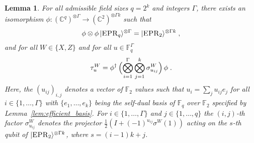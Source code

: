 \documentclass[11pt]{article}
\newtheorem{lemma}[theorem]{Lemma}
\theoremstyle{definition}
\newcommand{\ket}[1]{|#1\rangle}
\newcommand{\Id}{\ensuremath{I}}
\newcommand{\C}{\ensuremath{\mathbb{C}}}
\newcommand{\F}{\ensuremath{\mathbb{F}}}
\newcommand{\labelstyle}[1]{\ensuremath{\textsc{#1}}\xspace}
\newcommand{\EPR}{\labelstyle{EPR}}
\begin{document}
\begin{lemma}
  \label{lem:pauli-binary}
  For all admissible field sizes $q = 2^k$ and integers $\Gamma$, there exists
  an isomorphism $\phi: (\C^q)^{\otimes \Gamma} \to (\C^2)^{\otimes \Gamma k}$
  such that
	\begin{equation}
    \label{eq:epr-q-to-epr-2}
    \phi \otimes \phi \, \ket{\EPR_q}^{\otimes \Gamma} =
    \ket{\EPR_2}^{\otimes \Gamma k}\;,
  \end{equation}
  and for all $W \in \{X,Z\}$ and for all $u \in \F_q^\Gamma$
	\begin{equation}
	\label{eq:pauli-q-to-pauli-2}
  	\tau^W_u = \phi^\dagger\, \Bigl (\bigotimes_{i=1}^\Gamma
    \bigotimes_{j=1}^{k} \sigma^{W}_{u_{ij}} \Bigr) \, \phi\;.
	\end{equation}
	Here, the $(u_{ij})_{i,j}$ denotes a vector of $\F_2$ values such that $u_i =
  \sum_j u_{ij} e_j$ for all $i \in \{1,\ldots,\Gamma\}$ with
  $\{e_1,\ldots,e_{k}\}$ being the self-dual basis of $\F_q$ over $\F_2$
  specified by Lemma~\ref{lem:efficient_basis}.
  For $i\in\{1,\ldots,\Gamma\}$ and $j\in\{1,\ldots,q\}$ the $(i,j)$-th factor
  $\sigma^{W}_{u_{ij}}$ denotes the projector $\frac{1}{2} \left ( \Id +
    (-1)^{u_{ij}} \sigma^W(1) \right)$ acting on the $s$-th qubit of
  $\ket{\EPR_2}^{\otimes \Gamma k}$, where $s = (i-1) k + j$.
\end{lemma}
\end{document}
